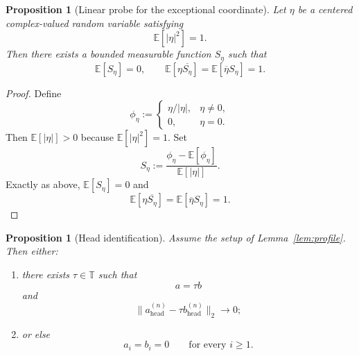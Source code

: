 \documentclass[11pt]{amsart}
\newtheorem{proposition}[theorem]{Proposition}
\newcommand{\E}{\mathbb{E}}
\newcommand{\T}{\mathbb{T}}
\begin{document}
\begin{proposition}[Linear probe for the exceptional coordinate]
\label{prop:exceptional-probe}
Let $\eta$ be a centered complex-valued random variable satisfying
\[
  \E[|\eta|^2]=1.
\]
Then there exists a bounded measurable function $S_\eta$ such that
\[
  \E[S_\eta]=0,
  \qquad
  \E[\eta\overline{S_\eta}]
  =
  \E[\overline{\eta}S_\eta]
  = 1.
\]
\end{proposition}

\begin{proof}
Define
\[
  \phi_\eta :=
  \begin{cases}
    \eta/|\eta|,& \eta\ne 0,\\
    0,& \eta=0.
  \end{cases}
\]
Then $\E[|\eta|]>0$ because $\E[|\eta|^2]=1$.  Set
\[
  S_\eta:=\frac{\phi_\eta-\E[\phi_\eta]}{\E[|\eta|]}.
\]
Exactly as above, $\E[S_\eta]=0$ and
\[
  \E[\eta\overline{S_\eta}]
  =
  \E[\overline{\eta}S_\eta]
  =1.
\]
\end{proof}

\begin{proposition}[Head identification]
\label{prop:head}
Assume the setup of Lemma~\ref{lem:profile}.  Then either:
\begin{enumerate}[label=\rm(\arabic*)]
\item there exists $\tau\in\T$ such that
\[
  a=\tau b
\]
and
\[
  \|a^{(n)}_{\mathrm{head}}-\tau b^{(n)}_{\mathrm{head}}\|_2\longrightarrow 0;
\]
\item or else
\[
  a_i=b_i=0
  \qquad\text{for every } i\ge 1.
\]
\end{enumerate}
\end{proposition}
\end{document}
